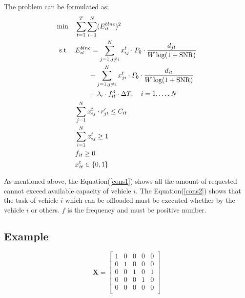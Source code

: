 \documentclass[conference]{IEEEtran}
\begin{document}
The problem can be formulated as:  
\begin{align}  		
	\min  \quad  &\sum \limits _{t=1} ^{T} \sum \limits _{i=1}^{N} (E^{blnc}_{it} )^ 2  \\
	\text{s.t.}   \quad   & 	    	E^{blnc} _{it}=
	\sum \limits_{j=1,  j \ne i}^{N} x _{ij}^{t} \cdot P_0 \cdot \frac{d_{jt}}{W\log (1 + \text{SNR})}  \notag \\
	&\quad \quad +\sum_{j=1 ,j \ne i }^{N} x _{ji}^{t} \cdot P_0 \cdot \frac{d_{it}}{W\log (1 + \text{SNR})}  \notag \\
	&\quad  \quad + \lambda_{i} \cdot f_{it}^{3} \cdot \Delta T
	,\quad i = 1, \dots ,N      \\
	& \sum    _{ j= 1} ^{N}
	{ x_{ij}^{t} \cdot  r'_{jt}} \le C_{it}       \label{cons1}   \\
	& \sum  _{ i= 1} ^N x_{ij}^{t} 	\ge 1  \label{cons2} \\
	&     	f_{it} \ge 0         \label{cons3}\\
	&      x_{it}^{t} \in \{0,1\}	  \label{cons4}
\end{align} 

As mentioned above, the Equation(\ref{cons1}) shows all the amount of requested cannot exceed available capacity of vehicle $i$.
The Equation(\ref{cons2}) shows that the task of vehicle $i$ which can be offloaded must be executed whether by the vehicle $i$ or others. $f$ is the frequency and must be positive number. 

\subsection{Example}
\begin{equation*}
	\mathbf{X} = 
	\begin{bmatrix}		
		1  &  0  &  0   &0  &  0 \\
		0  &  1  &  0  &  0 &   0\\
		0  &  0  &  1 &   0  &  1\\
		0  &  0 &  0   & 1   & 0 \\
		0  &  0 &   0   & 0 &   0\\
	\end{bmatrix}
\end{equation*}
\end{document}
